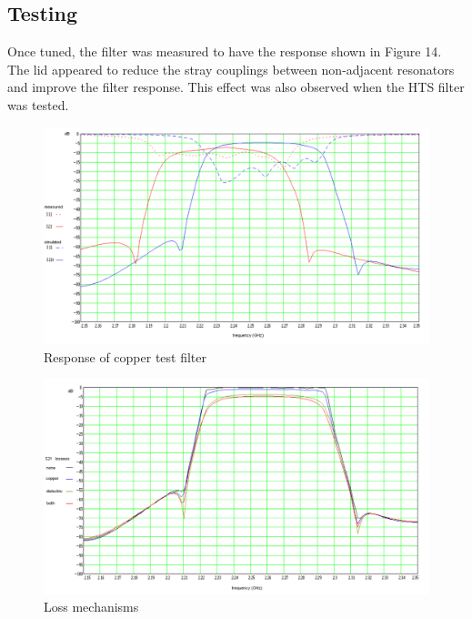 \subsection{Testing}
Once tuned, the filter was measured to have the response shown in Figure 14. The lid appeared to reduce the stray couplings between non-adjacent resonators and improve the filter response. This effect was also observed when the HTS filter was tested.

\begin{figure}[ht]
\hspace{-4em}
\includegraphics[scale=0.4]{fig/test-copper-response.pdf}
\vspace{-1em}
\caption{Response of copper test filter}
\label{figure:test-copper-response}
\end{figure}

\begin{figure}[ht]
\hspace{-4em}
\includegraphics[scale=0.4]{fig/test-copper-loss.pdf}
\vspace{-1em}
\caption{Loss mechanisms}
\label{figure:test-copper-loss}
\end{figure}

